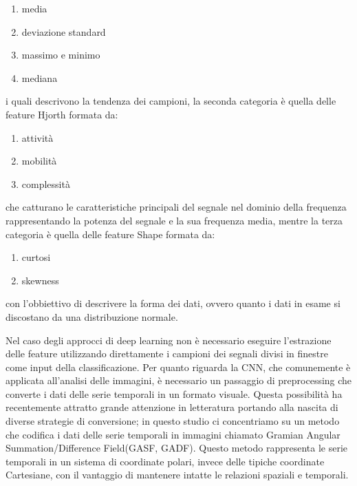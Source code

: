 \begin{enumerate}
    \item media
    \item deviazione standard
    \item massimo e minimo
    \item mediana
\end{enumerate}

i quali descrivono la tendenza dei campioni, la seconda categoria è quella delle feature Hjorth formata da:

\begin{enumerate}
    \item attività
    \item mobilità
    \item complessità
\end{enumerate}

che catturano le caratteristiche principali del segnale nel dominio della frequenza rappresentando la potenza del segnale e la sua frequenza media, mentre la terza categoria è quella delle feature Shape formata da:

\begin{enumerate}
    \item curtosi 
    \item skewness
\end{enumerate}

con l'obbiettivo di descrivere la forma dei dati, ovvero quanto i dati in esame si discostano da una distribuzione normale.

Nel caso degli approcci di deep learning non è necessario eseguire l'estrazione delle feature utilizzando direttamente i campioni dei segnali divisi in finestre come input della classificazione. Per quanto riguarda la CNN, che comunemente è applicata all'analisi delle immagini, è necessario un passaggio di preprocessing che converte i dati delle serie temporali in un formato visuale. Questa possibilità ha recentemente attratto grande attenzione in letteratura portando alla nascita di diverse strategie di conversione; in questo studio ci concentriamo su un metodo che codifica i dati delle serie temporali in immagini chiamato Gramian Angular Summation/Difference Field(GASF, GADF)\cite{wang2015imaging}. Questo metodo rappresenta le serie temporali in un sistema di coordinate polari, invece delle tipiche coordinate Cartesiane, con il vantaggio di mantenere intatte le relazioni spaziali e temporali. 

